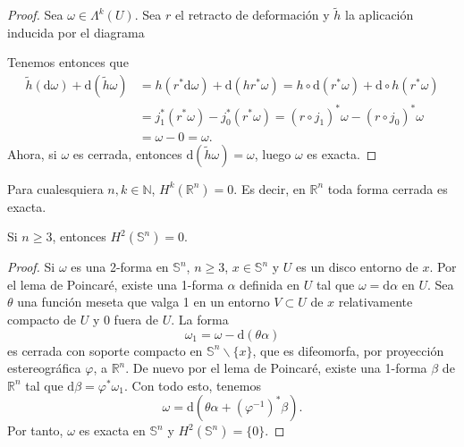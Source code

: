       \begin{proof}
	Sea $\omega \in \varLambda^k(U)$. Sea $r$ el retracto de deformación y $\tilde{h}$ la aplicación inducida por el diagrama
	\begin{center}
	 \end{center}
	 Tenemos entonces que 
	 \begin{align*}
	   \tilde{h}(\mathrm{d}\omega)+\mathrm{d}(\tilde{h}\omega)&=h(r^*\mathrm{d}\omega)+\mathrm{d}(hr^*\omega)=h\circ \mathrm{d}(r^*\omega)+\mathrm{d}\circ h(r^*\omega)\\
	   &= j_1^*(r^*\omega)-j_0^*(r^*\omega)=(r\circ j_1)^*\omega - (r\circ j_0)^* \omega\\& = \omega - 0 = \omega.
	 \end{align*}
	 Ahora, si $\omega$ es cerrada, entonces $\mathrm{d}(\tilde{h}\omega)=\omega$, luego $\omega$ es exacta.
      \end{proof}

      \begin{corol}
	Para cualesquiera $n, k \in \mathbb{N} $, $H^k(\mathbb{R} ^n)=0$. Es decir, en $\mathbb{R}^n$ toda forma cerrada es exacta.
      \end{corol}

 \begin{corol}
   Si $n\geq 3$, entonces $H^2(\mathbb{S}^n)={0}$.
\end{corol}

\begin{proof}
  Si $\omega$ es una 2-forma en $\mathbb{S}^n$, $n\geq 3$, $x\in \mathbb{S}^n$ y $U$ es un disco entorno de $x$. Por el lema de Poincaré, existe una 1-forma $\alpha$ definida en $U$ tal que $\omega=\mathrm{d} \alpha$ en $U$. Sea $\theta$ una función meseta que valga 1 en un entorno $V\subset U$ de $x$ relativamente compacto de $U$ y $0$ fuera de $U$. La forma 
  \begin{equation*}
    \omega_1=\omega - \mathrm{d}(\theta \alpha)
  \end{equation*}
  es cerrada con soporte compacto en $\mathbb{S}^n \backslash \{x\}$, que es difeomorfa, por proyección estereográfica $\varphi$, a $\mathbb{R} ^n$. De nuevo por el lema de Poincaré, existe una 1-forma $\beta$ de $\mathbb{R} ^n$ tal que $\mathrm{d} \beta = \varphi^* \omega_1$. Con todo esto, tenemos
  \begin{equation*}
    \omega=\mathrm{d}\left(\theta \alpha + \left( \varphi^{-1} \right)^* \beta \right) .
  \end{equation*}
  Por tanto, $\omega$ es exacta en $\mathbb{S}^n$ y 
$    H^2(\mathbb{S}^n)= \{0\}$.
\end{proof}

